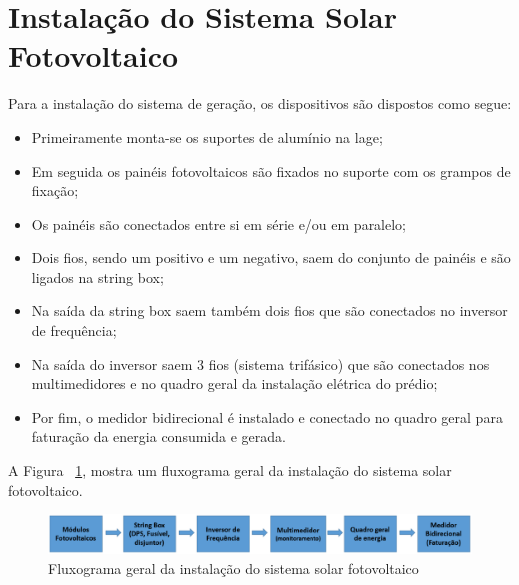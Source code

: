 \section{Instalação do Sistema Solar Fotovoltaico}

Para a instalação do sistema de geração, os dispositivos são dispostos como segue:
\begin{itemize}
  \item Primeiramente monta-se os suportes de alumínio na lage;
  \item Em seguida os painéis fotovoltaicos são fixados no suporte com os grampos de fixação;
  \item Os painéis são conectados entre si em série e/ou em paralelo;
  \item Dois fios, sendo um positivo e um negativo, saem do conjunto de painéis e são ligados na string box;
  \item Na saída da string box saem também dois fios que são conectados no inversor de frequência;
  \item Na saída do inversor saem 3 fios (sistema trifásico) que são conectados nos multimedidores e no quadro geral da instalação elétrica do prédio;
  \item Por fim, o medidor bidirecional é instalado e conectado no quadro geral para faturação da energia consumida e gerada.
\end{itemize}

A Figura ~\ref{fig:fluxograma}, mostra um fluxograma geral da instalação do sistema solar fotovoltaico.

\begin{figure}[!ht]
  \centering
  \includegraphics[keepaspectratio=true,scale=0.4]{figuras/instalacao_sistema.eps}
  \caption{Fluxograma geral da instalação do sistema solar fotovoltaico}
  \label{fig:fluxograma}
\end{figure}

